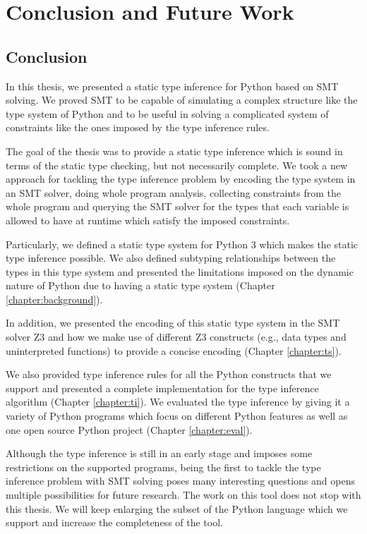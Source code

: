 
\chapter{Conclusion and Future Work}\label{chapter:conc}

\section{Conclusion}
In this thesis, we presented a static type inference for Python based on SMT solving. We proved SMT to be capable of simulating a complex structure like the type system of Python and to be useful in solving a complicated system of constraints like the ones imposed by the type inference rules.

The goal of the thesis was to provide a static type inference which is sound in terms of the static type checking, but not necessarily complete. We took a new approach for tackling the type inference problem by encoding the type system in an SMT solver, doing whole program analysis, collecting constraints from the whole program and querying the SMT solver for the types that each variable is allowed to have at runtime which satisfy the imposed constraints.

Particularly, we defined a static type system for Python 3 which makes the static type inference possible. We also defined subtyping relationships between the types in this type system and presented the limitations imposed on the dynamic nature of Python due to having a static type system (Chapter \ref{chapter:background}).

In addition, we presented the encoding of this static type system in the SMT solver Z3 and how we make use of different Z3 constructs (e.g., data types and uninterpreted functions) to provide a concise encoding (Chapter \ref{chapter:ts}).

We also provided type inference rules for all the Python constructs that we support and presented a complete implementation for the type inference algorithm (Chapter \ref{chapter:ti}). We evaluated the type inference by giving it a variety of Python programs which focus on different Python features as well as one open source Python project (Chapter \ref{chapter:eval}).

Although the type inference is still in an early stage and imposes some restrictions on the supported programs, being the first to tackle the type inference problem with SMT solving poses many interesting questions and opens multiple possibilities for future research. The work on this tool does not stop with this thesis. We will keep enlarging the subset of the Python language which we support and increase the completeness of the tool.

